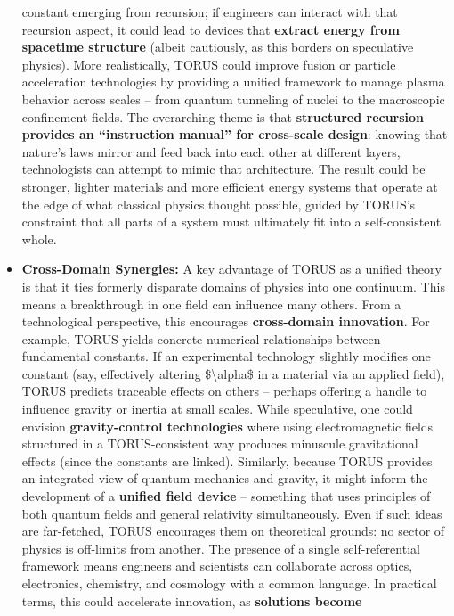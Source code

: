 \documentclass[]{article}
\begin{document}
\begin{itemize}
  constant emerging from recursion; if engineers can interact with that
  recursion aspect, it could lead to devices that \textbf{extract energy
  from spacetime structure} (albeit cautiously, as this borders on
  speculative physics). More realistically, TORUS could improve fusion
  or particle acceleration technologies by providing a unified framework
  to manage plasma behavior across scales -- from quantum tunneling of
  nuclei to the macroscopic confinement fields. The overarching theme is
  that \textbf{structured recursion provides an ``instruction manual''
  for cross-scale design}: knowing that nature's laws mirror and feed
  back into each other at different layers, technologists can attempt to
  mimic that architecture. The result could be stronger, lighter
  materials and more efficient energy systems that operate at the edge
  of what classical physics thought possible, guided by TORUS's
  constraint that all parts of a system must ultimately fit into a
  self-consistent whole.
\item
  \textbf{Cross-Domain Synergies:} A key advantage of TORUS as a unified
  theory is that it ties formerly disparate domains of physics into one
  continuum. This means a breakthrough in one field can influence many
  others. From a technological perspective, this encourages
  \textbf{cross-domain innovation}. For example, TORUS yields concrete
  numerical relationships between fundamental constants​. If an
  experimental technology slightly modifies one constant (say,
  effectively altering \$\textbackslash{}alpha\$ in a material via an
  applied field), TORUS predicts traceable effects on others -- perhaps
  offering a handle to influence gravity or inertia at small scales.
  While speculative, one could envision \textbf{gravity-control
  technologies} where using electromagnetic fields structured in a
  TORUS-consistent way produces minuscule gravitational effects (since
  the constants are linked). Similarly, because TORUS provides an
  integrated view of quantum mechanics and gravity, it might inform the
  development of a \textbf{unified field device} -- something that uses
  principles of both quantum fields and general relativity
  simultaneously. Even if such ideas are far-fetched, TORUS encourages
  them on theoretical grounds: no sector of physics is off-limits from
  another. The presence of a single self-referential framework means
  engineers and scientists can collaborate across optics, electronics,
  chemistry, and cosmology with a common language. In practical terms,
  this could accelerate innovation, as \textbf{solutions become
}
\end{itemize}
\end{document}
